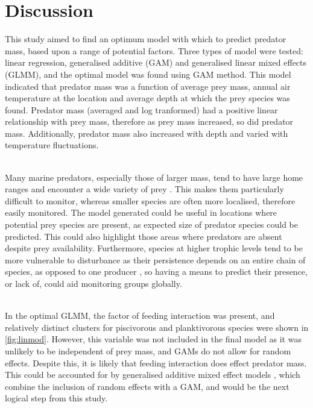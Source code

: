 \documentclass[11pt,a4paper]{article}
\begin{document}
	
	\section{Discussion}
	
	\par \noindent This study aimed to find an optimum model with which to predict predator mass, based upon a range of potential factors. Three types of model were tested: linear regression, generalised additive (GAM) and generalised linear mixed effects (GLMM), and the optimal model was found using GAM method. This model indicated that predator mass was a function of average prey mass, annual air temperature at the location and average depth at which the prey species was found. Predator mass (averaged and log tranformed) had a positive linear relationship with prey mass, therefore as prey mass increased, so did predator mass. Additionally, predator mass also increased with depth and varied with temperature fluctuations.
	
	\par \noindent ~\\ Many marine predators, especially those of larger mass, tend to have large home ranges and encounter a wide variety of prey \citep{Costa2016}. This makes them particularly difficult to monitor, whereas smaller species are often more localised, therefore easily monitored. The model generated could be useful in locations where potential prey species are present, as expected size of predator species could be predicted. This could also highlight those areas where predators are absent despite prey availability. Furthermore, species at higher trophic levels tend to be more vulnerable to disturbance as their persistence depends on an entire chain of species, as opposed to one producer \citep{Purvis2000}, so having a means to predict their presence, or lack of, could aid monitoring groups globally.
	
	\par \noindent ~\\ In the optimal GLMM, the factor of feeding interaction was present, and relatively distinct clusters for piscivorous and planktivorous species were shown in \ref{fig:linmod}. However, this variable was not included in the final model as it was unlikely to be independent of prey mass, and GAMs do not allow for random effects. Despite this, it is likely that feeding interaction does effect predator mass. This could be accounted for by generalised additive mixed effect models \citep{Zuur2009}, which combine the inclusion of random effects with a GAM, and would be the next logical step from this study.
	
\end{document}
